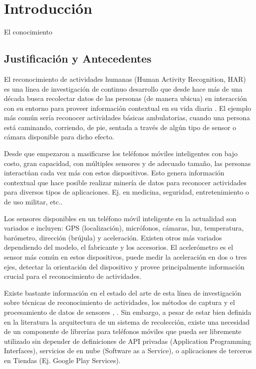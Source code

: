 \chapter{Introducción}

El conocimiento 

\section{Justificación y Antecedentes}
El reconocimiento de actividades humanas (Human Activity Recognition, HAR) es una línea de investigación de continuo desarrollo que desde hace más de una década busca recolectar datos de las personas (de manera ubicua) en interacción con su entorno para proveer información contextual en su vida diaria \cite{Bao2004}. El ejemplo más común sería reconocer actividades básicas ambulatorias, cuando una persona está caminando, corriendo, de pie, sentada a través de algún tipo de sensor o cámara disponible para dicho efecto.

Desde que empezaron a masificarse los teléfonos móviles inteligentes con bajo costo, gran capacidad, con múltiples sensores y de adecuado tamaño, las personas interactúan cada vez más con estos dispositivos. Esto genera información contextual que hace posible realizar minería de datos para reconocer actividades para diversos tipos de aplicaciones. Ej. en medicina, seguridad, entretenimiento o de uso militar, etc.\cite{LaraLabrador2013}.

Los sensores disponibles en un teléfono móvil inteligente en la actualidad son variados e incluyen: GPS (localización), micrófonos, cámaras, luz, temperatura, barómetro, dirección (brújula) y aceleración. Existen otros más variados dependiendo del modelo, el fabricante y los accesorios. El acelerómetro es el sensor más común en estos dispositivos, puede medir la aceleración en dos o tres ejes, detectar la orientación del dispositivo y provee principalmente información crucial para el reconocimiento de actividades.

Existe bastante información en el estado del arte de esta línea de investigación sobre técnicas de reconocimiento de actividades, los métodos de captura y el procesamiento de datos de sensores \cite{LaraLabrador2012}, \cite{Kwapisz2011}. Sin embargo, a pesar de estar bien definida en la literatura la arquitectura de un sistema de recolección, existe una necesidad de un componente de librerías para teléfonos móviles que pueda ser libremente utilizado sin depender de definiciones de API privadas (Application Programming Interfaces), servicios de en nube (Software as a Service), o aplicaciones de terceros en Tiendas (Ej. Google Play Services).

